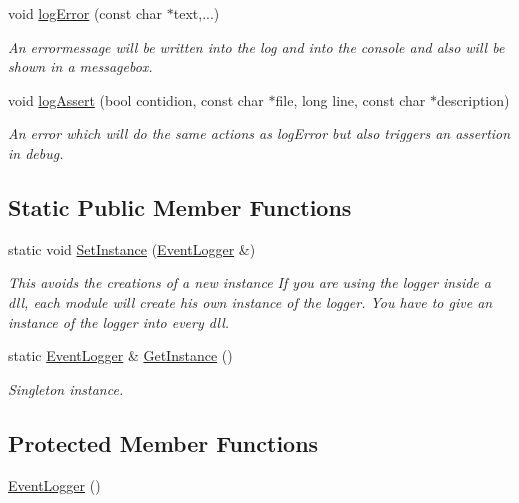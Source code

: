 \begin{DoxyCompactItemize}
void \hyperlink{class_a_c_t_k_1_1_event_logger_aaf5784b73cb4af44de9ef42f07e83dfb}{log\-Error} (const char $\ast$text,...)
\begin{DoxyCompactList}\small\item\em An errormessage will be written into the log and into the console and also will be shown in a messagebox. \end{DoxyCompactList}\item 
void \hyperlink{class_a_c_t_k_1_1_event_logger_a41d10974ec383480e476a7cad2eecb7a}{log\-Assert} (bool contidion, const char $\ast$file, long line, const char $\ast$description)
\begin{DoxyCompactList}\small\item\em An error which will do the same actions as log\-Error but also triggers an assertion in debug. \end{DoxyCompactList}\end{DoxyCompactItemize}
\subsection*{Static Public Member Functions}
\begin{DoxyCompactItemize}
\item 
static void \hyperlink{class_a_c_t_k_1_1_event_logger_aa9ce6de9b431dfcc5c6ebd65c4c6302c}{Set\-Instance} (\hyperlink{class_a_c_t_k_1_1_event_logger}{Event\-Logger} \&)
\begin{DoxyCompactList}\small\item\em This avoids the creations of a new instance If you are using the logger inside a dll, each module will create his own instance of the logger. You have to give an instance of the logger into every dll. \end{DoxyCompactList}\item 
static \hyperlink{class_a_c_t_k_1_1_event_logger}{Event\-Logger} \& \hyperlink{class_a_c_t_k_1_1_event_logger_acf848cde8431d19d8b39d56807276f39}{Get\-Instance} ()
\begin{DoxyCompactList}\small\item\em Singleton instance. \end{DoxyCompactList}\end{DoxyCompactItemize}
\subsection*{Protected Member Functions}
\begin{DoxyCompactItemize}
\item 
\hyperlink{class_a_c_t_k_1_1_event_logger_a7667792998154478abe36a568b80496c}{Event\-Logger} ()
\end{DoxyCompactItemize}


